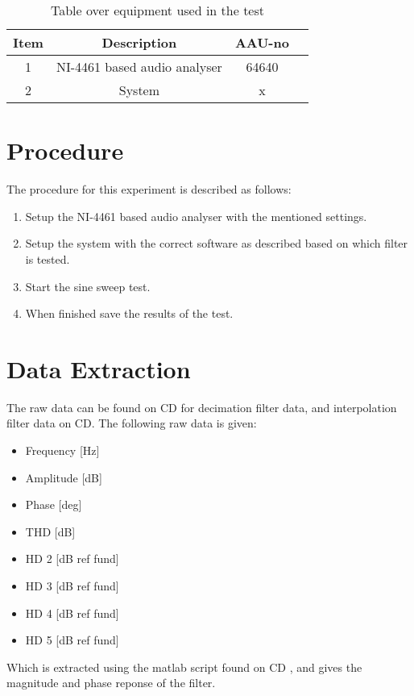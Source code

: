 \begin{table}[H]
\centering
{}
\begin{tabular}{S[table-format=1]ccc} \toprule
    {Item} & {Description} & {AAU-no} \\       &  NI-4461 based audio analyser  & 64640  \\ 
    2      &  System  & x  \\  \bottomrule 
\end{tabular}
\caption{Table over equipment used in the test}
\label{tab:UsedEquipmentDecimation}
\end{table}
\vspace{-5mm}


\section{Procedure}
The procedure for this experiment is described as follows:
\vspace{-5mm}
\begin{enumerate}
\item Setup the NI-4461 based audio analyser with the mentioned settings.
\item Setup the system with the correct software as described based on which filter is tested.
\item Start the sine sweep test.
\item When finished save the results of the test.
\end{enumerate}

\section{Data Extraction}
The raw data can be found on CD for decimation filter data, and interpolation filter data on CD.  The following raw data is given:
\begin{itemize}
\item Frequency [Hz]
\item Amplitude [dB]
\item Phase 	[deg]
\item THD 		[dB]
\item HD 2 		[dB ref fund]
\item HD 3		[dB ref fund]
\item HD 4      [dB ref fund]
\item HD 5      [dB ref fund]
\end{itemize} 
Which is extracted using the matlab script found on CD , and gives the magnitude and phase reponse of the filter.
